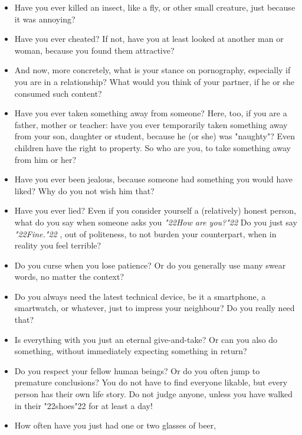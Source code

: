 \documentclass[12pt,a4paper]{article}
\newcommand{\q}[1]{\char"22{#1}\char"22 }
\newcommand{\qq}[1]{\textit{\q{#1}}}
\begin{document}
\begin{itemize}[nosep]
					For example,
					in traffic,
					have you shouted \qq{Idiot} at someone who cut you off?
			\item	Have you ever killed an insect,
					like a fly,
					or other small creature,
					just because it was annoying?
			\item	Have you ever cheated?
					If not,
					have you at least looked at another man or woman,
					because you found them attractive?
			\item	And now,
					more concretely,
					what is your stance on pornography,
					especially if you are in a relationship?
					What would you think of your partner,
					if he or she consumed such content?
			\item	Have you ever taken something away from someone?
					Here,
					too,
					if you are a father,
					mother or teacher:
					have you ever temporarily taken something away from your son,
					daughter or student,
					because he (or she) was "naughty"?
					Even children have the right to property.
					So who are you,
					to take something away from him or her?
			\item	Have you ever been jealous,
					because someone had something you would have liked?
					Why do you not wish him that?
			\item	Have you ever lied?
					Even if you consider yourself a (relatively) honest person,
					what do you say when someone asks you
					\qq{How are you?}
					Do you just say \qq{Fine.},
					out of politeness,
					to not burden your counterpart,
					when in reality you feel terrible?
			\item	Do you curse when you lose patience?
					Or do you generally use many swear words,
					no matter the context?
			\item	Do you always need the latest technical device,
					be it a smartphone,
					a smartwatch,
					or whatever,
					just to impress your neighbour?
					Do you really need that?
			\item	Is everything with you just an eternal give-and-take?
					Or can you also do something,
					without immediately expecting something in return?
			\item	Do you respect your fellow human beings?
					Or do you often jump to premature conclusions?
					You do not have to find everyone likable,
					but every person has their own life story.
					Do not judge anyone,
					unless you have walked in their \q{shoes} for at least a day!
			\item	How often have you just had one or two glasses of beer,

\end{itemize}
\end{document}
